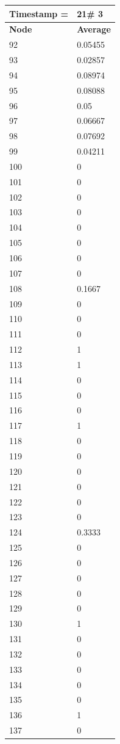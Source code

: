 \begin{tabular}{|l||l|}
\hline
\textbf{Timestamp =} & \textbf{21}\# 3\\\hline
	\textbf{Node} & \textbf{Average} \\ \hline
\hline
	92 & 0.05455 \\ \hline
	93 & 0.02857 \\ \hline
	94 & 0.08974 \\ \hline
	95 & 0.08088 \\ \hline
	96 & 0.05 \\ \hline
	97 & 0.06667 \\ \hline
	98 & 0.07692 \\ \hline
	99 & 0.04211 \\ \hline
	100 & 0 \\ \hline
	101 & 0 \\ \hline
	102 & 0 \\ \hline
	103 & 0 \\ \hline
	104 & 0 \\ \hline
	105 & 0 \\ \hline
	106 & 0 \\ \hline
	107 & 0 \\ \hline
	108 & 0.1667 \\ \hline
	109 & 0 \\ \hline
	110 & 0 \\ \hline
	111 & 0 \\ \hline
	112 & 1 \\ \hline
	113 & 1 \\ \hline
	114 & 0 \\ \hline
	115 & 0 \\ \hline
	116 & 0 \\ \hline
	117 & 1 \\ \hline
	118 & 0 \\ \hline
	119 & 0 \\ \hline
	120 & 0 \\ \hline
	121 & 0 \\ \hline
	122 & 0 \\ \hline
	123 & 0 \\ \hline
	124 & 0.3333 \\ \hline
	125 & 0 \\ \hline
	126 & 0 \\ \hline
	127 & 0 \\ \hline
	128 & 0 \\ \hline
	129 & 0 \\ \hline
	130 & 1 \\ \hline
	131 & 0 \\ \hline
	132 & 0 \\ \hline
	133 & 0 \\ \hline
	134 & 0 \\ \hline
	135 & 0 \\ \hline
	136 & 1 \\ \hline
	137 & 0 \\ \hline
\end{tabular}

